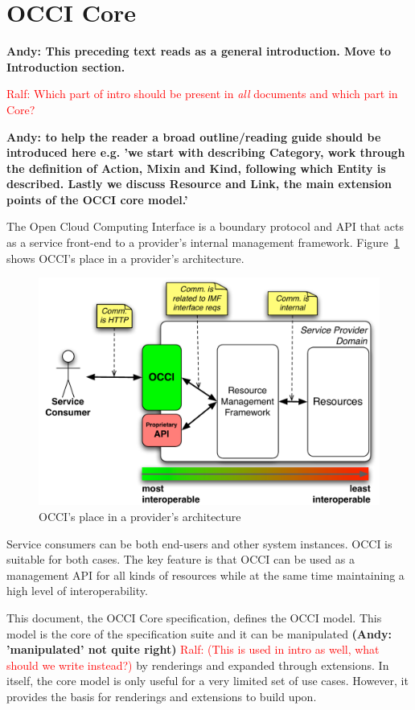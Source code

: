 \documentclass[10pt,a4paper]{article}
\newcommand{\ralf}[1]{\textcolor{red}{Ralf: #1}}
\begin{document}
\section{OCCI Core}
\textbf{Andy: This preceding text reads as a general introduction. Move to Introduction section.}

\ralf{Which part of intro should be present in {\em all} documents and which part in Core?}

\textbf{Andy: to help the reader a broad outline/reading guide should be introduced here
e.g. 'we start with describing Category, work through the definition of Action, Mixin and Kind,
following which Entity is described. Lastly we discuss Resource and Link, the main extension
points of the OCCI core model.'}

The Open Cloud Computing Interface is a boundary protocol and API
that acts as a service front-end to a provider's internal management
framework. Figure~\ref{fig:placement} shows OCCI's place in a
provider's architecture.
\begin{figure}[h]
	\centering
	\includegraphics[scale=0.5]{figs/occi-intro.pdf}
	\caption{OCCI's place in a provider's architecture}
	\label{fig:placement}
\end{figure}
Service consumers can be both end-users and other system instances. OCCI is
suitable for both cases. The key feature is that OCCI can be used as a
management API for all kinds of resources while at the same time maintaining a
high level of interoperability.

This document, the OCCI Core specification, defines the OCCI model. This
model is the core of the specification suite and it can be manipulated 
\textbf{(Andy: 'manipulated' not quite right)}
\ralf{(This is used in intro as well, what should we write instead?)}
by renderings and expanded 
through extensions. In itself, the core model is only useful
for a very limited set of use cases. However, it provides the basis for
renderings and extensions to build upon.
\end{document}
